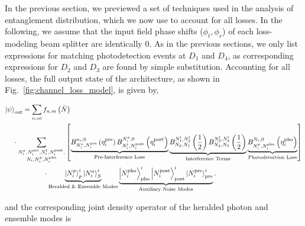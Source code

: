\documentclass[aps,twocolumn,secnumarabic,amsmath,amssymb,pra,groupedaddress,
showpacs, showkeys]{revtex4-1}
\newcommand{\ket}[1]{\left|#1\right\rangle}
\newcommand{\pna}[1]{\left(#1\right)}
\newcommand{\pnb}[1]{\left[#1\right]}
\begin{document}
In the previous section, we previewed a set of techniques used in the analysis
of entanglement distribution, which we now use to account for all losses. In
the following, we assume that the input field phase shifts ($\phi_t,\phi_r$) of
each loss-modeling beam splitter are identically 0. As in the previous
sections, we only list expressions for matching photodetection events at $D_1$
and $D_4$, as corresponding expressions for $D_2$ and $D_3$ are found by simple
substitution. Accounting for all losses, the full output state of the
architecture, as shown in Fig.~\ref{fig:channel_loss_model}, is given by,
\begin{widetext}
\begin{align}
\ket{\psi}_{\textrm{out}} & = \sum_{n,m} f_{n,m}\pna{\bar{N}} \nonumber \\
& \hspace{-5mm}\cdot
\sum_{\substack{N_i^a,N_i^{\textrm{pre}},N_i^l,N_i^{\textrm{post}},\\ N_i,N_i^p,N_i^{\textrm{pho}} }}
\pnb{\underbrace{B_{N_i^a,N_i^{\textrm{pre}}}^{n_i,0}\pna{\eta_i^{\textrm{pre}}}  
B_{N_i^l,N_i^{\textrm{post}}}^{N_i^a,0}\pna{\eta_i^{\textrm{post}}}}_\text{Pre-Interference Loss}
\underbrace{B_{N_2,N_1}^{N_1^l,N_2^l}\pna{\frac{1}{2}} B_{N_4,N_3}^{N_3^l,N_4^l}\pna{\frac{1}{2}}}_\text{Interference Terms}
\underbrace{B_{N_i^p,N_i^{\textrm{pho}}}^{N_i,0}\pna{\eta_i^{\textrm{pho}}}}_\text{Photodetection Loss}}   \nonumber \\
& \qquad \quad \cdot \underbrace{\ket{N_i^p}_{p}^i \ket{N_i^a}_{S}^i}_\text{Heralded \& Ensemble Modes} \underbrace{\ket{N_i^{\textrm{pho}}}_{\textrm{pho}}^i \ket{N_i^{\textrm{post}}}_{\textrm{post}}^i \ket{N_i^{\textrm{pre}}}_{\textrm{pre}}^i}_\text{Auxiliary Noise Modes}. 
\end{align}
\end{widetext}
and the corresponding joint density operator of the heralded photon and
ensemble modes is 
\end{document}
